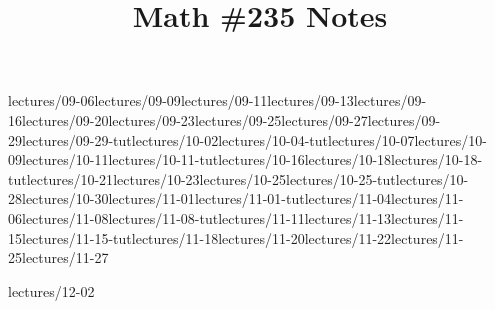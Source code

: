 \documentclass{scrartcl}
\title{Math \#235 Notes}
\begin{document}
\maketitle

\clearpage
\tableofcontents



{lectures/09-06}{lectures/09-09}{lectures/09-11}{lectures/09-13}{lectures/09-16}{lectures/09-20}{lectures/09-23}{lectures/09-25}{lectures/09-27}{lectures/09-29}{lectures/09-29-tut}{lectures/10-02}{lectures/10-04-tut}{lectures/10-07}{lectures/10-09}{lectures/10-11}{lectures/10-11-tut}{lectures/10-16}{lectures/10-18}{lectures/10-18-tut}{lectures/10-21}{lectures/10-23}{lectures/10-25}{lectures/10-25-tut}{lectures/10-28}{lectures/10-30}{lectures/11-01}{lectures/11-01-tut}{lectures/11-04}{lectures/11-06}{lectures/11-08}{lectures/11-08-tut}{lectures/11-11}{lectures/11-13}{lectures/11-15}{lectures/11-15-tut}{lectures/11-18}{lectures/11-20}{lectures/11-22}{lectures/11-25}{lectures/11-27}

{lectures/12-02}
\end{document}
